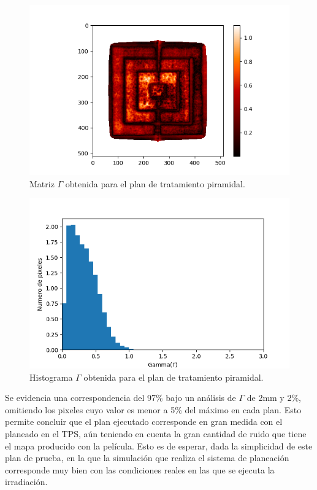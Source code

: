 \begin{figure}[H]
	\centering
	\includegraphics[width=0.9\linewidth]{images/gammaPiramideCalor.png}
	\caption{Matriz $\Gamma$ obtenida para el plan de tratamiento piramidal. }
	\label{fig:matrixGAmmaPiramide}
\end{figure}
\begin{figure}[H]
	\centering
	\includegraphics[width=0.9\linewidth]{images/histogramaGammaPiramide.png}
	\caption{Histograma $\Gamma$ obtenida para el plan de tratamiento piramidal.  }
	\label{fig:histogramaGAmmaPiramide}
\end{figure}

Se evidencia una correspondencia del 97\% bajo un análisis de $\Gamma$ de 2mm y 2\%, omitiendo los pixeles cuyo valor es menor a 5\% del máximo en cada plan. Esto permite concluir que el plan ejecutado corresponde en gran medida con el planeado en el TPS, aún teniendo en cuenta la gran cantidad de ruido  que tiene el mapa producido con la película. Esto es de esperar, dada la simplicidad de este plan de prueba, en la que la simulación que realiza el sistema de planeación corresponde muy bien con las condiciones reales en las que se ejecuta la irradiación.\\


